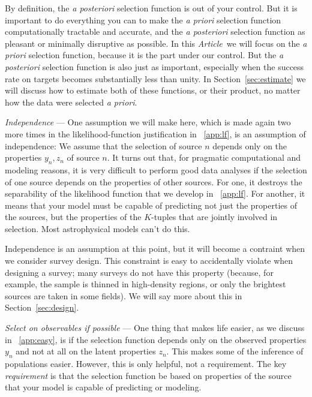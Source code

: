 \documentclass[modern]{aastex62}
\newcommand{\documentname}{\textsl{Article}}
\newcommand{\sectionname}{Section}
\newcommand{\foreign}[1]{\textsl{#1}}
\renewcommand{\paragraph}[1]{\medskip\noindent\textit{#1} ---}
\begin{document}
By definition, the \foreign{a posteriori} selection function is out of
your control.
But it is important to do everything you can to make the \foreign{a
  priori} selection function computationally tractable and accurate,
and the \foreign{a posteriori} selection function as pleasant or
minimally disruptive as possible.
In this \documentname\ we will focus on the \foreign{a priori}
selection function, because it is the part under our control.
But the \foreign{a posteriori} selection function is also just as
important, especially when the success rate on targets becomes
substantially less than unity.
In \sectionname~\ref{sec:estimate} we will discuss how to estimate
both of these functions, or their product, no matter how the data
were selected \foreign{a priori}.

\paragraph{Independence}
One assumption we will make here, which is made again two more times
in the likelihood-function justification in
\appendixname~\ref{app:lf}, is an assumption of independence:
We assume that the selection of source $n$ depends only on
the properties $y_n, z_n$ of source $n$.
It turns out that, for pragmatic computational and modeling reasons,
it is very difficult to perform good data analyses if the selection of
one source depends on the properties of other sources.
For one, it destroys the separability of the likelihood function
that we develop in \appendixname~\ref{app:lf}.
For another, it means that your model must be capable of predicting
not just the properties of the sources, but the properties of the
$K$-tuples that are jointly involved in selection.
Most astrophysical models can't do this.

Independence is an assumption at this point, but it will become a contraint
when we consider survey design.
This constraint is easy to accidentally violate when
designing a survey; many surveys do not have this property (because,
for example, the sample is thinned in high-density regions, or only
the brightest sources are taken in some fields).
We will say more about this in \sectionname~\ref{sec:design}.

\paragraph{Select on observables if possible}
One thing that makes life easier, as we discuss in \appendixname~\ref{app:easy},
is if the selection function depends only on the observed
properties $y_n$ and not at all on the latent properties $z_n$.
This makes some of the inference of populations easier.
However, this is only helpful, not a requirement.
The key \emph{requirement} is that the selection function be based
on properties of the source that your model is capable of predicting
or modeling.
\end{document}
